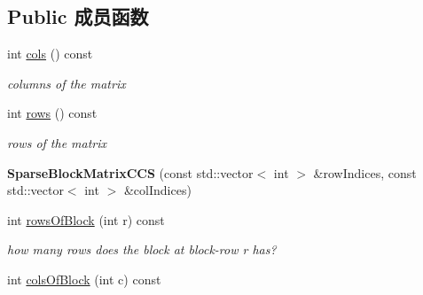 \subsection*{Public 成员函数}
\begin{DoxyCompactItemize}
\item 
\hypertarget{classg2o_1_1SparseBlockMatrixCCS_a4f04707008af38a3c368eed74ad0bffc}{int \hyperlink{classg2o_1_1SparseBlockMatrixCCS_a4f04707008af38a3c368eed74ad0bffc}{cols} () const }\label{classg2o_1_1SparseBlockMatrixCCS_a4f04707008af38a3c368eed74ad0bffc}

\begin{DoxyCompactList}\small\item\em columns of the matrix \end{DoxyCompactList}\item 
\hypertarget{classg2o_1_1SparseBlockMatrixCCS_ac40b53774ff036f56faaa0bfb87837c0}{int \hyperlink{classg2o_1_1SparseBlockMatrixCCS_ac40b53774ff036f56faaa0bfb87837c0}{rows} () const }\label{classg2o_1_1SparseBlockMatrixCCS_ac40b53774ff036f56faaa0bfb87837c0}

\begin{DoxyCompactList}\small\item\em rows of the matrix \end{DoxyCompactList}\item 
\hypertarget{classg2o_1_1SparseBlockMatrixCCS_abaeeb7ad0ba28f37dba85601882806f1}{{\bfseries Sparse\-Block\-Matrix\-C\-C\-S} (const std\-::vector$<$ int $>$ \&row\-Indices, const std\-::vector$<$ int $>$ \&col\-Indices)}\label{classg2o_1_1SparseBlockMatrixCCS_abaeeb7ad0ba28f37dba85601882806f1}

\item 
\hypertarget{classg2o_1_1SparseBlockMatrixCCS_a5152d431cdd268586dcde5cf79a5f202}{int \hyperlink{classg2o_1_1SparseBlockMatrixCCS_a5152d431cdd268586dcde5cf79a5f202}{rows\-Of\-Block} (int r) const }\label{classg2o_1_1SparseBlockMatrixCCS_a5152d431cdd268586dcde5cf79a5f202}

\begin{DoxyCompactList}\small\item\em how many rows does the block at block-\/row r has? \end{DoxyCompactList}\item 
\hypertarget{classg2o_1_1SparseBlockMatrixCCS_a268101f9f1e179fdac973f9c565c168d}{int \hyperlink{classg2o_1_1SparseBlockMatrixCCS_a268101f9f1e179fdac973f9c565c168d}{cols\-Of\-Block} (int c) const }\label{classg2o_1_1SparseBlockMatrixCCS_a268101f9f1e179fdac973f9c565c168d}


\end{DoxyCompactItemize}
